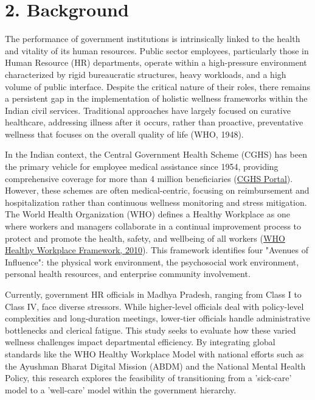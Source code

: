 \documentclass[11pt,a4paper]{article}
\begin{document}
\section{2. Background}
\vspace{0.2cm}
The performance of government institutions is intrinsically linked to the health and vitality of its human resources. Public sector employees, particularly those in Human Resource (HR) departments, operate within a high-pressure environment characterized by rigid bureaucratic structures, heavy workloads, and a high volume of public interface. Despite the critical nature of their roles, there remains a persistent gap in the implementation of holistic wellness frameworks within the Indian civil services. Traditional approaches have largely focused on curative healthcare, addressing illness after it occurs, rather than proactive, preventative wellness that focuses on the overall quality of life (WHO, 1948).

In the Indian context, the Central Government Health Scheme (CGHS) has been the primary vehicle for employee medical assistance since 1954, providing comprehensive coverage for more than 4 million beneficiaries (\href{https://cghs.gov.in/}{CGHS Portal}). However, these schemes are often medical-centric, focusing on reimbursement and hospitalization rather than continuous wellness monitoring and stress mitigation. The World Health Organization (WHO) defines a Healthy Workplace as one where workers and managers collaborate in a continual improvement process to protect and promote the health, safety, and wellbeing of all workers (\href{https://www.who.int/publications/i/item/9789241599313}{WHO Healthy Workplace Framework, 2010}). This framework identifies four "Avenues of Influence": the physical work environment, the psychosocial work environment, personal health resources, and enterprise community involvement.

Currently, government HR officials in Madhya Pradesh, ranging from Class I to Class IV, face diverse stressors. While higher-level officials deal with policy-level complexities and long-duration meetings, lower-tier officials handle administrative bottlenecks and clerical fatigue. This study seeks to evaluate how these varied wellness challenges impact departmental efficiency. By integrating global standards like the WHO Healthy Workplace Model with national efforts such as the Ayushman Bharat Digital Mission (ABDM) and the National Mental Health Policy, this research explores the feasibility of transitioning from a 'sick-care' model to a 'well-care' model within the government hierarchy.
\end{document}
